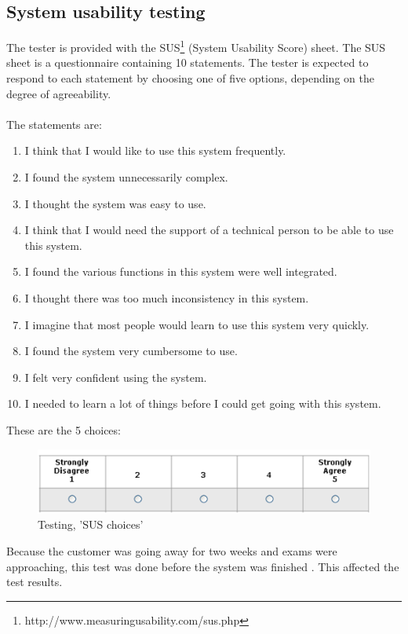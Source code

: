 \subsection{System usability testing}
The tester is provided with the SUS\footnote{http://www.measuringusability.com/sus.php} (System Usability Score) sheet. The SUS sheet is a questionnaire containing 10 statements. The tester is expected to respond to each statement by choosing one of five options, depending on the degree of agreeability.\\
\\
The statements are:
\begin{enumerate} \setlength{\itemsep}{0cm}\setlength{\parskip}{0cm}
	\item I think that I would like to use this system frequently.
	\item I found the system unnecessarily complex.
	\item I thought the system was easy to use.
	\item I think that I would need the support of a technical person to be able to use this system.
	\item I found the various functions in this system were well integrated.
	\item I thought there was too much inconsistency in this system.
	\item I imagine that most people would learn to use this system very quickly.
	\item I found the system very cumbersome to use.
	\item I felt very confident using the system.
	\item I needed to learn a lot of things before I could get going with this system.
\end{enumerate}
These are the 5 choices:

\begin{figure}[H]
  \centering
    \includegraphics[width=1.0\textwidth]{img/sus-responses.png}
  \caption{Testing, 'SUS choices'} 
  \label{fig:sus_response}
\end{figure}
Because the customer was going away for two weeks and exams were approaching, this test was done before the system was finished . This affected the test results.

